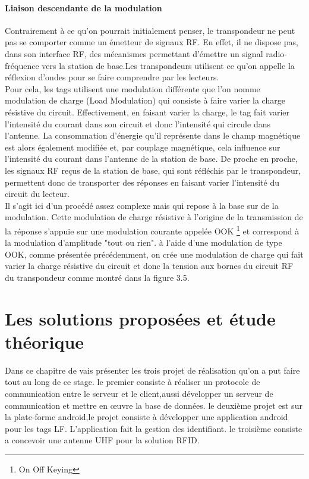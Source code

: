 \documentclass[11pt, a4paper, twoside]{book}
\begin{document}
\subsubsection{Liaison descendante de la modulation}
Contrairement à ce qu'on pourrait initialement penser, le transpondeur ne peut pas se comporter comme un émetteur de signaux RF. En effet, il ne dispose pas, dans son interface RF, des mécanismes permettant d'émettre un signal radio-fréquence vers la station de base.Les transpondeurs utilisent ce qu'on appelle la réflexion d'ondes pour se faire comprendre par les lecteurs. \\

Pour cela, les tags utilisent une modulation différente que l'on nomme modulation de charge (Load Modulation) qui consiste à faire varier la charge résistive du circuit. Effectivement, en faisant varier la charge, le tag fait varier l'intensité du courant dans son circuit et donc l'intensité qui circule dans l'antenne. La consommation d'énergie qu'il représente dans le champ magnétique est alors également modifiée et, par couplage magnétique, cela influence sur l'intensité du courant dans l'antenne de la station de base. De proche en proche, les signaux RF reçus de la station de base, qui sont réfléchis par le transpondeur, permettent donc de transporter des réponses en faisant varier l'intensité du circuit du lecteur.\\

Il s'agit ici d'un procédé assez complexe mais qui repose à la base sur de la modulation. Cette modulation de charge résistive à l'origine de la transmission de la réponse s'appuie sur une modulation courante appelée OOK \footnote{On Off Keying} et correspond à la modulation d'amplitude "tout ou rien". à l'aide d'une modulation de type OOK, comme présentée précédemment, on crée une modulation de charge qui fait varier la charge résistive du circuit et donc la tension aux bornes du circuit RF du transpondeur comme montré dans la figure 3.5.\\
\chapter{Les solutions proposées et étude théorique }
Dans ce chapitre de vais présenter les trois projet de réalisation qu'on a put faire tout au long de ce stage. le premier consiste à réaliser un protocole de communication entre le serveur et le client,aussi développer un serveur de communication et mettre en œuvre la base de données. le deuxième projet est sur la plate-forme android,le projet consiste à développer une application android pour les tags LF. L'application fait la gestion des identifiant. le troisième consiste a concevoir une antenne UHF pour la solution RFID. 
\end{document}

